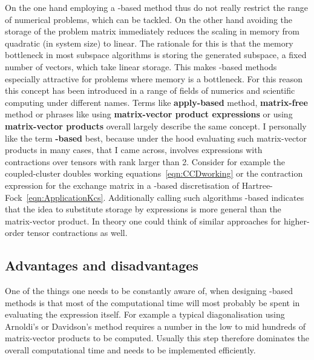 On the one hand employing a \contraction-based method thus do not really
restrict the range of numerical problems, which can be tackled.
On the other hand avoiding the storage of the problem matrix
immediately reduces the scaling in memory from quadratic (in system size) to linear.
The rationale for this is that the memory bottleneck
in most subspace algorithms is storing the generated subspace,
\ie a fixed number of vectors, which take linear storage.
This makes \contraction-based methods especially
attractive for problems where memory is a bottleneck.
For this reason this concept has been
introduced in a range of fields of numerics and scientific computing
under different names.
Terms like \textbf{apply-based} method, \textbf{matrix-free} method
or phrases like using \textbf{matrix-vector product expressions}
or using \textbf{matrix-vector products}
overall largely describe the same concept.
I personally like the term \textbf{\contraction-based} best,
because under the hood
evaluating such matrix-vector products in many cases,
that I came across,
involves expressions with contractions over tensors with rank larger than 2.
Consider for example the coupled-cluster doubles working equations~\eqref{eqn:CCDworking}
or the contraction expression for the exchange matrix
in a \CS-based discretisation of Hartree-Fock~\eqref{eqn:ApplicationKcs}.
Additionally calling such algorithms \contraction-based
indicates that the idea to substitute storage by expressions
is more general than the matrix-vector product.
In theory one could think of similar approaches for
higher-order tensor contractions as well.

\subsection{Advantages and disadvantages}
\label{sec:ContraAdvDisadv}
One of the things one needs to be constantly aware of,
when designing \contraction-based methods
is that most of the computational time will most probably be spent
in evaluating the \contraction expression itself.
For example a typical diagonalisation using Arnoldi's or Davidson's method
requires a number in the low to mid hundreds of matrix-vector products to be computed.
Usually this step therefore dominates the overall
computational time and needs to be implemented efficiently.

